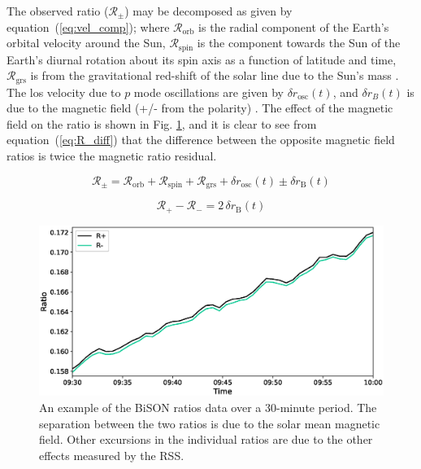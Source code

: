 The observed ratio ($\mathcal{R}_{\pm}$) may be decomposed as given by equation~(\ref{eq:vel_comp}); where $\mathcal{R}_{\mathrm{orb}}$ is the radial component of the Earth's orbital velocity around the Sun, $\mathcal{R}_{\mathrm{spin}}$ is the component towards the Sun of the Earth's diurnal rotation about its spin axis as a function of latitude and time, $\mathcal{R}_{\mathrm{grs}}$ is from the gravitational red-shift of the solar line due to the Sun's mass \citep{elsworth_techniques_1995, dumbill_observation_1999}. The \gls{los} velocity due to $p$ mode oscillations are given by $\delta {r}_{\mathrm{osc}}(t)$, and $\delta {r}_B(t)$ is due to the magnetic field (+/- from the polarity) \citep{dumbill_observation_1999}. The effect of the magnetic field on the ratio is shown in Fig. \ref{fig:ratio_split}, and it is clear to see from equation~(\ref{eq:R_diff}) that the difference between the opposite magnetic field ratios is twice the magnetic ratio residual.

\begin{equation}
\mathcal{R}_{\pm} = \mathcal{R}_{\mathrm{orb}} + \mathcal{R}_{\mathrm{spin}} + \mathcal{R}_{\mathrm{grs}} + \delta {r}_{\mathrm{osc}}(t) \pm \delta {r}_{\mathrm{B}}(t)
\label{eq:vel_comp}
\end{equation}

\begin{equation}
\mathcal{R}_{+} - \mathcal{R}_{-} = 2 \, \delta {r}_{\mathrm{B}}(t)
\label{eq:R_diff}
\end{equation}

\begin{figure}[ht!]
	\includegraphics[width=\columnwidth]{Fred_ratio_zoom.eps}
	\caption{An example of the BiSON ratios data over a 30-minute period. The separation between the two ratios is due to the solar mean magnetic field. Other excursions in the individual ratios are due to the other effects measured by the RSS.}
	\label{fig:ratio_split}
\end{figure}

